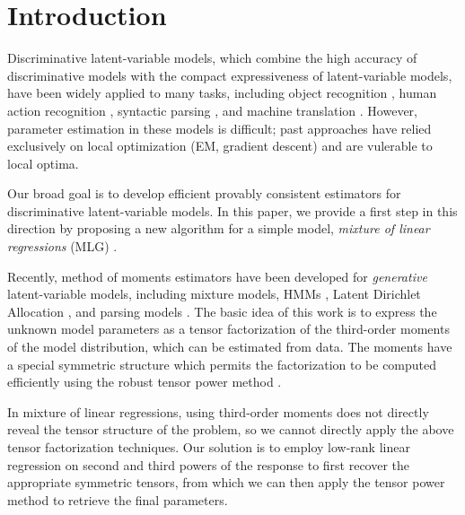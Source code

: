 \section{Introduction}
\label{sec:intro}

Discriminative latent-variable models,
which combine the high accuracy of discriminative models
with the compact expressiveness of latent-variable models,
have been widely applied to many tasks, including
object recognition \cite{quattoni04crf},
human action recognition \cite{wang09crf},
syntactic parsing \cite{petrov08discriminative},
and machine translation \cite{liang06discrimative}.
However, parameter estimation in these models is difficult;
past approaches have relied exclusively on local optimization (EM, 
gradient descent) and are vulerable to local optima.

Our broad goal is to develop efficient provably consistent estimators for
discriminative latent-variable models.
In this paper, we provide a first step in this 
direction by proposing a new algorithm for a simple model,
\emph{mixture of linear regressions} (MLG) \cite{VieleTong2002}.

Recently, method of moments estimators have been developed for
\emph{generative} latent-variable models, including
mixture models, HMMs \cite{AnandkumarHsuKakade2012},
Latent Dirichlet Allocation \cite{anandkumar12lda},
and parsing models \cite{hsu12identifiability}.
The basic idea of this work is to express
the unknown model parameters as a tensor factorization
of the third-order moments of the model distribution, which
can be estimated from data.
The moments have a special symmetric structure
which permits the factorization to be computed efficiently using the robust
tensor power method \cite{AnandkumarGeHsu2012}.

In mixture of linear regressions, using third-order moments does not directly
reveal the tensor structure of the problem, so we cannot directly
apply the above tensor factorization techniques.
Our solution is to employ low-rank linear regression
\cite{NegahbanWainwright2009,Tomioka2011} on second
and third powers of the response to first recover the appropriate symmetric
tensors, from which we can then apply the tensor power method to retrieve the
final parameters.

